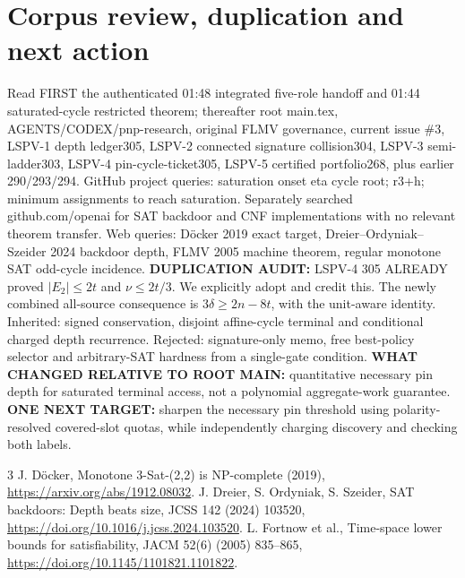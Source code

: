\documentclass[11pt]{article}
\begin{document}
\section{Corpus review, duplication and next action}
Read FIRST the authenticated 01:48 integrated five-role handoff and 01:44 saturated-cycle restricted theorem; thereafter root main.tex, AGENTS/CODEX/pnp-research, original FLMV governance, current issue \#3, LSPV-1 depth ledger305, LSPV-2 connected signature collision304, LSPV-3 semi-ladder303, LSPV-4 pin-cycle-ticket305, LSPV-5 certified portfolio268, plus earlier 290/293/294. GitHub project queries: saturation onset eta cycle root; r3+h; minimum assignments to reach saturation. Separately searched github.com/openai for SAT backdoor and CNF implementations with no relevant theorem transfer. Web queries: D\"ocker 2019 exact target, Dreier--Ordyniak--Szeider 2024 backdoor depth, FLMV 2005 machine theorem, regular monotone SAT odd-cycle incidence.
\noindent\textbf{DUPLICATION AUDIT:} LSPV-4 305 ALREADY proved $|E_2|\le2t$ and $\nu\le2t/3$. We explicitly adopt and credit this. The newly combined all-source consequence is $3\delta\ge2n-8t$, with the unit-aware identity. Inherited: signed conservation, disjoint affine-cycle terminal and conditional charged depth recurrence. Rejected: signature-only memo, free best-policy selector and arbitrary-SAT hardness from a single-gate condition. \textbf{WHAT CHANGED RELATIVE TO ROOT MAIN:} quantitative necessary pin depth for saturated terminal access, not a polynomial aggregate-work guarantee. \textbf{ONE NEXT TARGET:} sharpen the necessary pin threshold using polarity-resolved covered-slot quotas, while independently charging discovery and checking both labels.
\begin{thebibliography}{3}
 J. D\"ocker, Monotone 3-Sat-(2,2) is NP-complete (2019), \url{https://arxiv.org/abs/1912.08032}.
 J. Dreier, S. Ordyniak, S. Szeider, SAT backdoors: Depth beats size, JCSS 142 (2024) 103520, \url{https://doi.org/10.1016/j.jcss.2024.103520}.
 L. Fortnow et al., Time-space lower bounds for satisfiability, JACM 52(6) (2005) 835--865, \url{https://doi.org/10.1145/1101821.1101822}.
\end{thebibliography}
\end{document}
